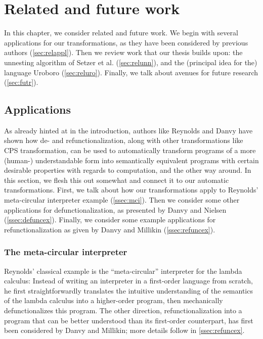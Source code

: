 \chapter{Related and future work}

In this chapter, we consider related and future work. We begin with several applications for our transformations, as they have been considered by previous authors (\autoref{sec:relappl}). Then we review work that our thesis builds upon: the unnesting algorithm of Setzer et al. (\autoref{sec:relunn}), and the (principal idea for the) language Uroboro (\autoref{sec:reluro}). Finally, we talk about avenues for future research (\autoref{sec:futr}).

\section{Applications}
\label{sec:relappl}

As already hinted at in the introduction, authors like Reynolds and Danvy have shown how de- and refunctionalization, along with other transformations like CPS transformation, can be used to automatically transform programs of a more (human-) understandable form into semantically equivalent programs with certain desirable properties with regards to computation, and the other way around. In this section, we flesh this out somewhat and connect it to our automatic transformations. First, we talk about how our transformations apply to Reynolds' meta-circular interpreter example (\autoref{ssec:mci}). Then we consider some other applications for defunctionalization, as presented by Danvy and Nielsen\cite{danvy01defunctionalization} (\autoref{ssec:defuncex}). Finally, we consider some example applications for refunctionalization as given by Danvy and Millikin\cite{danvy09refunctionalization} (\autoref{ssec:refuncex}).

\subsection{The meta-circular interpreter}
\label{ssec:mci}

Reynolds' classical example is the ``meta-circular'' interpreter for the lambda calculus: Instead of writing an interpreter in a first-order language from scratch, he first straightforwardly translates the intuitive understanding of the semantics of the lambda calculus into a higher-order program, then mechanically defunctionalizes this program. The other direction, refunctionalization into a program that can be better understood than its first-order counterpart, has first been considered by Danvy and Millikin\cite{danvy09refunctionalization}; more details follow in \autoref{ssec:refuncex}.

